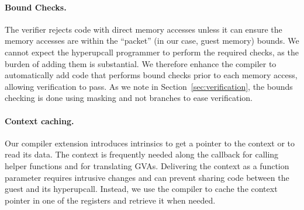 \documentclass[11pt]{article}
\newcommand{\hypercallback}{hyperupcall\xspace{}}
\begin{document}


\paragraph{Bound Checks.}
The verifier rejects code with direct memory accesses unless it can ensure
the memory accesses are within the ``packet'' (in our case, guest memory) bounds.
We cannot expect the \hypercallback{} programmer to perform the required checks, 
as the burden of adding them is substantial. We therefore enhance the compiler 
to automatically add code that performs bound checks prior to each memory access,
allowing verification to pass. As we note in Section~\ref{sec:verification}, 
the bounds checking is done using masking and not branches to ease verification.


\paragraph{Context caching.}
Our compiler extension introduces 
intrinsics to get a pointer to the context or to read its data. The context
is frequently needed along the callback for calling helper functions
and for translating GVAs. Delivering the context
as a function parameter requires intrusive 
changes and can prevent sharing code between the guest and its \hypercallback.
Instead, we use the compiler to cache the context pointer in one of the registers
and retrieve it when needed.
\end{document}
